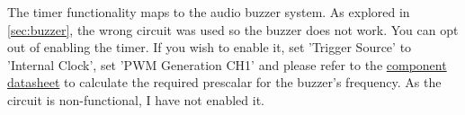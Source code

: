 The timer functionality maps to the audio buzzer system. As explored in \autoref{sec:buzzer}, the wrong circuit was used so the buzzer does not work.
You can opt out of enabling the timer.
If you wish to enable it, set 'Trigger Source' to 'Internal Clock', set 'PWM Generation CH1' and please refer to the \href{https://au.mouser.com/datasheet/3/6118/1/cbt_09427_smt_tr.pdf}{component datasheet} to calculate the required prescalar for the buzzer's frequency.
As the circuit is non-functional, I have not enabled it.